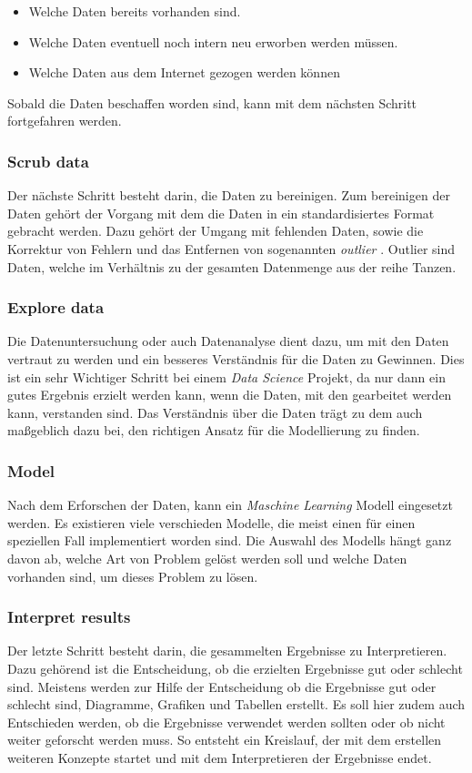 \begin{itemize}
    \item Welche Daten bereits vorhanden sind.
    \item Welche Daten eventuell noch intern neu erworben werden müssen.
    \item Welche Daten aus dem Internet gezogen werden können
\end{itemize}

Sobald die Daten beschaffen worden sind, kann mit dem nächsten Schritt fortgefahren werden.

\subsubsection{Scrub data}
Der nächste Schritt besteht darin, die Daten zu bereinigen. Zum bereinigen der Daten gehört der Vorgang mit dem die Daten in ein standardisiertes Format gebracht werden. Dazu gehört der Umgang mit fehlenden Daten, sowie die Korrektur von Fehlern und das Entfernen von sogenannten \emph{outlier} \cite{Vorgehen_ds}. Outlier sind Daten, welche im Verhältnis zu der gesamten Datenmenge aus der reihe Tanzen. 

\subsubsection{Explore data}
Die Datenuntersuchung oder auch Datenanalyse dient dazu, um mit den Daten vertraut zu werden und ein besseres Verständnis für die Daten zu Gewinnen. Dies ist ein sehr Wichtiger Schritt bei einem \emph{Data Science} Projekt, da nur dann ein gutes Ergebnis erzielt werden kann, wenn die Daten, mit den gearbeitet werden kann, verstanden sind. Das Verständnis über die Daten trägt zu dem auch maßgeblich dazu bei, den richtigen Ansatz für die Modellierung zu finden.

\subsubsection{Model}
Nach dem Erforschen der Daten, kann ein \emph{Maschine Learning} Modell eingesetzt werden. Es existieren viele verschieden Modelle, die meist einen für einen speziellen Fall implementiert worden sind. Die Auswahl des Modells hängt ganz davon ab, welche Art von Problem gelöst werden soll und welche Daten vorhanden sind, um dieses Problem zu lösen. 

\subsubsection{Interpret results}
Der letzte Schritt besteht darin, die gesammelten Ergebnisse zu Interpretieren. Dazu gehörend ist die Entscheidung, ob die erzielten Ergebnisse gut oder schlecht sind. Meistens werden zur Hilfe der Entscheidung ob die Ergebnisse gut oder schlecht sind, Diagramme, Grafiken und Tabellen erstellt. Es soll hier zudem auch Entschieden werden, ob die Ergebnisse verwendet werden sollten oder ob nicht weiter geforscht werden muss. So entsteht ein Kreislauf, der mit dem erstellen weiteren Konzepte startet und mit dem Interpretieren der Ergebnisse endet. 
